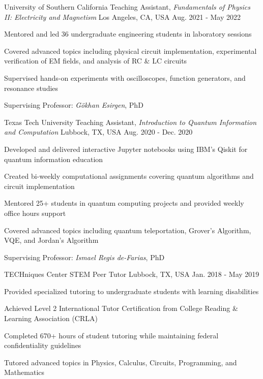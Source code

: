 
\begin{cventries}
    \cventry
    {University of Southern California}
    {Teaching Assistant, \textit{Fundamentals of Physics II: Electricity and Magnetism}}
    {Los Angeles, CA, USA}
    {Aug. 2021 - May 2022}
    {
        \begin{cvitems}
        \item{Mentored and led 36 undergraduate engineering students in laboratory sessions}
        \item{Covered advanced topics including physical circuit implementation, experimental verification of EM fields, and analysis of RC \& LC circuits}
        \item{Supervised hands-on experiments with oscilloscopes, function generators, and resonance studies}
        \item{Supervising Professor: \textit{G\"{o}khan Esirgen}, PhD}
        \end{cvitems}
        \vspace{1em}
    }

    \cventry
    {Texas Tech University}
    {Teaching Assistant, \textit{Introduction to Quantum Information and Computation}}
    {Lubbock, TX, USA}
    {Aug. 2020 - Dec. 2020}
    {
        \begin{cvitems}
        \item{Developed and delivered interactive Jupyter notebooks using IBM's Qiskit for quantum information education}
        \item{Created bi-weekly computational assignments covering quantum algorithms and circuit implementation}
        \item{Mentored 25+ students in quantum computing projects and provided weekly office hours support}
        \item{Covered advanced topics including quantum teleportation, Grover's Algorithm, VQE, and Jordan's Algorithm}
        \item{Supervising Professor: \textit{Ismael Regis de-Farias}, PhD}
        \end{cvitems}
        \vspace{1em}
    }

    \cventry
    {TECHniques Center}
    {STEM Peer Tutor}
    {Lubbock, TX, USA}
    {Jan. 2018 - May 2019}
    {
        \begin{cvitems}
        \item{Provided specialized tutoring to undergraduate students with learning disabilities}
        \item{Achieved Level 2 International Tutor Certification from College Reading \& Learning Association (CRLA)}
        \item{Completed 670+ hours of student tutoring while maintaining federal confidentiality guidelines}
        \item{Tutored advanced topics in Physics, Calculus, Circuits, Programming, and Mathematics}
        \end{cvitems}
        \vspace{1em}
    }


\end{cventries}
